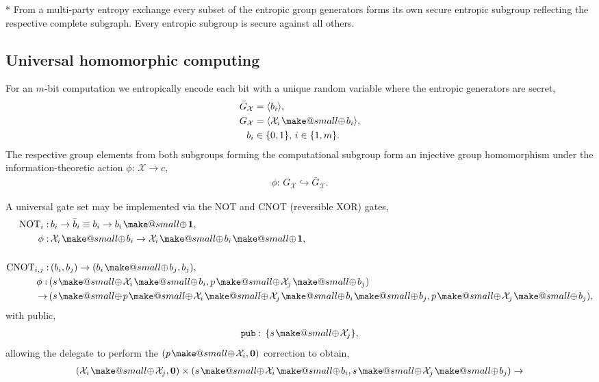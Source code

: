 \documentclass[twocolumn, aps, amsmath, amssymb, nofootinbib, superscriptaddress, longbibliography, doublefloatfix, table-of-contents, eqsecnum, rmp]{revtex4-2}
\makeatletter
\def\zerovec{\mathbf{0}}
\def\onevec{\mathbf{1}}
\newcommand{\soplus}{{{\hspace{1pt}}{\mathbin{\mathpalette\make@small{\mathbin\oplus}}}}{\hspace{1pt}}}
\newcommand{\make@small}[2]{%
  \vcenter{\hbox{%
    \scalebox{0.6}{$\m@th#1#2$}%
  }}%
}
\makeatother
\begin{document}
* From a multi-party entropy exchange every subset of the entropic group generators forms its own secure entropic subgroup reflecting the respective complete subgraph. Every entropic subgroup is secure against all others.

\subsection{Universal homomorphic computing}

For an $m$-bit computation we entropically encode each bit with a unique random variable where the entropic generators are secret,
\begin{align}
	\bar{G}_\mathcal{X} &= \langle b_i \rangle,\nonumber\\
	G_\mathcal{X} &= \langle \mathcal{X}_i \soplus b_i \rangle,\nonumber\\
	b_i &\in\{0,1\},\, i\in\{1,m\}.
\end{align}
The respective group elements from both subgroups forming the computational subgroup form an injective group homomorphism under the information-theoretic action $\phi:\, \mathcal{X}\to c$,
\begin{align}
	\phi:\, G_\mathcal{X}  \hookrightarrow \bar{G}_\mathcal{X}.
\end{align}

A universal gate set may be implemented via the NOT and CNOT (reversible XOR) gates,
\begin{align}
	\mathrm{NOT}_i:&\, b_i \to \bar{b}_i \equiv b_i \to b_i\soplus \onevec,\\
	\phi:&\, \mathcal{X}_i\soplus b_i \to \mathcal{X}_i\soplus b_i \soplus \onevec,\nonumber\\
	\nonumber\\
	\mathrm{CNOT}_{i,j}:&\, (b_i,b_j) \to (b_i\soplus b_j,b_j),\nonumber\\
	\phi:\, &(s\soplus \mathcal{X}_i\soplus b_i, p\soplus \mathcal{X}_j\soplus b_j)\nonumber\\
	\to\, &(s\soplus p \soplus \mathcal{X}_i \soplus \mathcal{X}_j \soplus b_i \soplus b_j, p\soplus \mathcal{X}_j\soplus b_j),\nonumber
\end{align}
with public,
\begin{align}
	\mathtt{pub}:\,\{s\soplus \mathcal{X}_j\},
\end{align}
allowing the delegate to perform the $(p\soplus\mathcal{X}_i,\zerovec)$ correction to obtain,
\begin{align}
	(\mathcal{X}_i\soplus\mathcal{X}_j,\zerovec) \times (s\soplus \mathcal{X}_i\soplus b_i, s\soplus \mathcal{X}_j\soplus b_j) \to 
\end{align}
\end{document}
